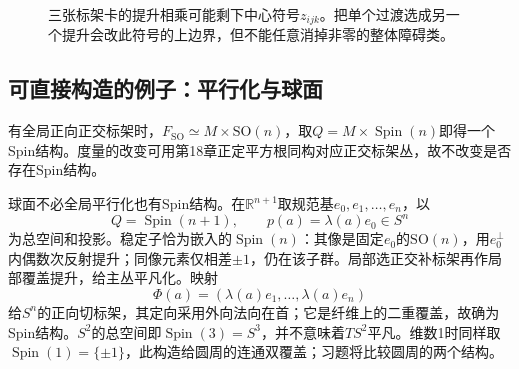 \begin{figure}[htbp]
\centering
\caption{三张标架卡的提升相乘可能剩下中心符号$z_{ijk}$。把单个过渡选成另一个提升会改此符号的上边界，但不能任意消掉非零的整体障碍类。}
\label{fig:spin-transition-sign}
\end{figure}

\subsection{可直接构造的例子：平行化与球面}
有全局正向正交标架时，$F_{\mathrm{SO}}\simeq M\times\mathrm{SO}(n)$，取$Q=M\times\operatorname{Spin}(n)$即得一个Spin结构。度量的改变可用第18章正定平方根同构对应正交标架丛，故不改变是否存在Spin结构。

球面不必全局平行化也有Spin结构。在$\mathbb R^{n+1}$取规范基$e_0,e_1,\ldots,e_n$，以
\[
 Q=\operatorname{Spin}(n+1),\qquad p(a)=\lambda(a)e_0\in S^n
\]
为总空间和投影。稳定子恰为嵌入的$\operatorname{Spin}(n)$：其像是固定$e_0$的$\mathrm{SO}(n)$，用$e_0^\perp$内偶数次反射提升；同像元素仅相差$\pm1$，仍在该子群。局部选正交补标架再作局部覆盖提升，给主丛平凡化。映射
\[
 \Phi(a)=(\lambda(a)e_1,\ldots,\lambda(a)e_n)
\]
给$S^n$的正向切标架，其定向采用外向法向在首；它是纤维上的二重覆盖，故确为Spin结构。$S^2$的总空间即$\operatorname{Spin}(3)=S^3$，并不意味着$TS^2$平凡。维数1时同样取$\operatorname{Spin}(1)=\{\pm1\}$，此构造给圆周的连通双覆盖；习题将比较圆周的两个结构。
